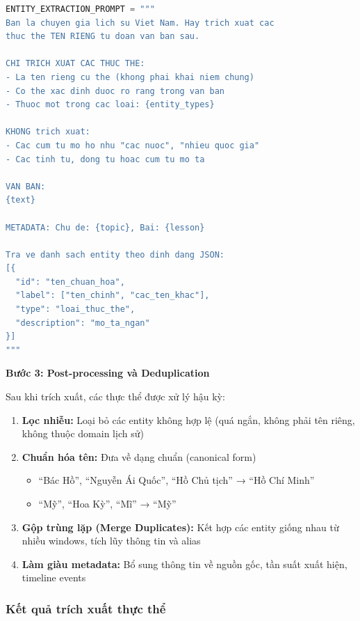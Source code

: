 \begin{lstlisting}[language=Python, caption={Template prompt cho entity extraction}]
ENTITY_EXTRACTION_PROMPT = """
Ban la chuyen gia lich su Viet Nam. Hay trich xuat cac 
thuc the TEN RIENG tu doan van ban sau.

CHI TRICH XUAT CAC THUC THE:
- La ten rieng cu the (khong phai khai niem chung)
- Co the xac dinh duoc ro rang trong van ban
- Thuoc mot trong cac loai: {entity_types}

KHONG trich xuat:
- Cac cum tu mo ho nhu "cac nuoc", "nhieu quoc gia"
- Cac tinh tu, dong tu hoac cum tu mo ta

VAN BAN:
{text}

METADATA: Chu de: {topic}, Bai: {lesson}

Tra ve danh sach entity theo dinh dang JSON:
[{
  "id": "ten_chuan_hoa",
  "label": ["ten_chinh", "cac_ten_khac"],
  "type": "loai_thuc_the",
  "description": "mo_ta_ngan"
}]
"""
\end{lstlisting}

\textbf{Bước 3: Post-processing và Deduplication}

Sau khi trích xuất, các thực thể được xử lý hậu kỳ:

\begin{enumerate}
    \item \textbf{Lọc nhiễu:} Loại bỏ các entity không hợp lệ (quá ngắn, không phải tên riêng, không thuộc domain lịch sử)
    
    \item \textbf{Chuẩn hóa tên:} Đưa về dạng chuẩn (canonical form)
    \begin{itemize}
        \item ``Bác Hồ'', ``Nguyễn Ái Quốc'', ``Hồ Chủ tịch'' → ``Hồ Chí Minh''
        \item ``Mỹ'', ``Hoa Kỳ'', ``Mĩ'' → ``Mỹ''
    \end{itemize}
    
    \item \textbf{Gộp trùng lặp (Merge Duplicates):} Kết hợp các entity giống nhau từ nhiều windows, tích lũy thông tin và alias
    
    \item \textbf{Làm giàu metadata:} Bổ sung thông tin về nguồn gốc, tần suất xuất hiện, timeline events
\end{enumerate}

\subsubsection{Kết quả trích xuất thực thể}

